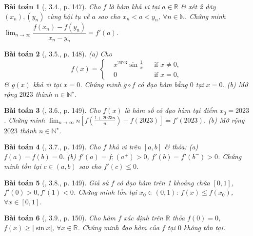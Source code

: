 \documentclass{article}
\newtheorem{baitoan}{Bài toán}
\begin{document}
\begin{baitoan}[\cite{Quoc_Long_Dat_Nam_VMC}, 3.4., p. 147]
	Cho $f$ là hàm khả vi tại $a\in\mathbb{R}$ \& xét 2 dãy $(x_n),(y_n)$ cùng hội tụ về $a$ sao cho $x_n < a < y_n$, $\forall n\in\mathbb{N}$. Chứng minh $\lim_{n\to\infty} \dfrac{f(x_n) - f(y_n)}{x_n - y_n} = f'(a)$.
\end{baitoan}

\begin{baitoan}[\cite{Quoc_Long_Dat_Nam_VMC}, 3.5., p. 148]
	(a) Cho
	\begin{equation*}
		f(x) = \left\{\begin{split}
			&x^{2023}\sin\frac{1}{x}&&\mbox{if } x\ne0,\\
			&0&&\mbox{if } x = 0,
		\end{split}\right.
	\end{equation*}
	\& $g(x)$ khả vi tại $x = 0$. Chứng minh $g\circ f$ có đạo hàm bằng $0$ tại $x = 0$. (b) Mở rộng $2023$ thành $n\in\mathbb{N}^\star$.
\end{baitoan}

\begin{baitoan}[\cite{Quoc_Long_Dat_Nam_VMC}, 3.6., p. 149]
	Cho $f(x)$ là hàm số có đạo hàm tại điểm $x_0 = 2023$. Chứng minh $\lim_{n\to\infty} n\left[f\left(\frac{1 + 2023n}{n}\right) - f(2023)\right] = f'(2023)$. (b) Mở rộng $2023$ thành $n\in\mathbb{N}^\star$.
\end{baitoan}

\begin{baitoan}[\cite{Quoc_Long_Dat_Nam_VMC}, 3.7., p. 149]
	Cho $f$ khả vi trên $[a,b]$ \& thỏa: (a) $f(a) = f(b) = 0$. (b) $f'(a) = f;(a^+) > 0$, $f'(b) = f'(b^-) > 0$. Chứng minh tồn tại $c\in(a,b)$ sao cho $f'(c)\le0$.
\end{baitoan}

\begin{baitoan}[\cite{Quoc_Long_Dat_Nam_VMC}, 3.8., p. 149]
	Giả sử $f$ có đạo hàm trên 1 khoảng chứa $[0,1]$, $f'(0) > 0,f'(1) < 0$. Chứng minh tồn tại $x_0\in(0,1)$: $f(x)\le f(x_0)$, $\forall x\in[0,1]$.
\end{baitoan}

\begin{baitoan}[\cite{Quoc_Long_Dat_Nam_VMC}, 3.9., p. 150]
	Cho hàm $f$ xác định trên $\mathbb{R}$ thỏa $f(0) = 0$, $f(x)\ge|\sin x|$, $\forall x\in\mathbb{R}$. Chứng minh đạo hàm của $f$ tại $0$ không tồn tại.
\end{baitoan}

\end{document}

